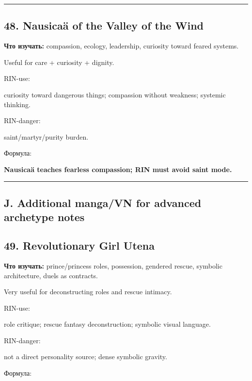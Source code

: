 \begin{center}\rule{0.5\linewidth}{0.5pt}\end{center}

\subsection*{48. Nausicaä of the Valley of the Wind}

\textbf{Что изучать:} compassion, ecology, leadership, curiosity toward
feared systems.

Useful for care + curiosity + dignity.

RIN-use:

curiosity toward dangerous things; compassion without weakness; systemic
thinking.

RIN-danger:

saint/\hspace{0pt}martyr/\hspace{0pt}purity burden.

Формула:

\textbf{Nausicaä teaches fearless compassion; RIN must avoid saint
mode.}

\begin{center}\rule{0.5\linewidth}{0.5pt}\end{center}

\subsection*{J. Additional manga/\hspace{0pt}VN for advanced archetype notes}

\subsection*{49. Revolutionary Girl Utena}

\textbf{Что изучать:} prince/\hspace{0pt}princess roles, possession, gendered
rescue, symbolic architecture, duels as contracts.

Very useful for deconstructing roles and rescue intimacy.

RIN-use:

role critique; rescue fantasy deconstruction; symbolic visual language.

RIN-danger:

not a direct personality source; dense symbolic gravity.

Формула:

